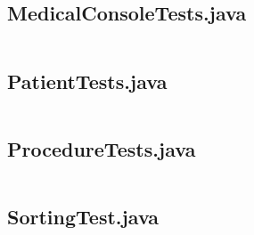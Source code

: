 \documentclass{article}
\begin{document}
	\subsection{MedicalConsoleTests.java} 
	\inputminted{java}{src/test/java/com/yvesstraten/medicalconsole/tests/MedicalConsoleTests.java}

	\subsection{PatientTests.java} 
	\inputminted{java}{src/test/java/com/yvesstraten/medicalconsole/tests/PatientTests.java}

	\subsection{ProcedureTests.java} 
	\inputminted{java}{src/test/java/com/yvesstraten/medicalconsole/tests/ProcedureTests.java}

	\subsection{SortingTest.java} 
	\inputminted{java}{src/test/java/com/yvesstraten/medicalconsole/tests/SortingTest.java}
\end{document}
